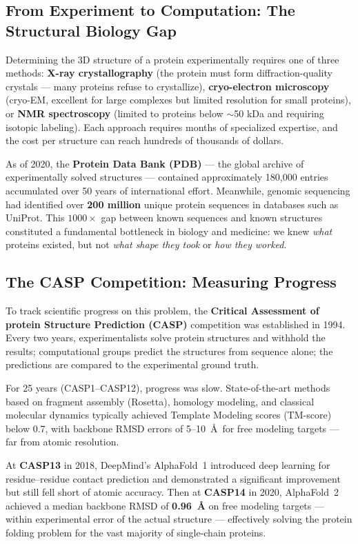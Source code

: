 ﻿\documentclass[12pt,a4paper]{article}
\begin{document}
\subsection{From Experiment to Computation: The Structural Biology Gap}

Determining the 3D structure of a protein experimentally requires one of three methods: \textbf{X-ray crystallography} (the protein must form diffraction-quality crystals --- many proteins refuse to crystallize), \textbf{cryo-electron microscopy} (cryo-EM, excellent for large complexes but limited resolution for small proteins), or \textbf{NMR spectroscopy} (limited to proteins below $\sim$50 kDa and requiring isotopic labeling). Each approach requires months of specialized expertise, and the cost per structure can reach hundreds of thousands of dollars.

As of 2020, the \textbf{Protein Data Bank (PDB)} --- the global archive of experimentally solved structures --- contained approximately 180,000 entries accumulated over 50 years of international effort. Meanwhile, genomic sequencing had identified over \textbf{200 million} unique protein sequences in databases such as UniProt. This $1000\times$ gap between known sequences and known structures constituted a fundamental bottleneck in biology and medicine: we knew \emph{what} proteins existed, but not \emph{what shape they took} or \emph{how they worked}.

\subsection{The CASP Competition: Measuring Progress}

To track scientific progress on this problem, the \textbf{Critical Assessment of protein Structure Prediction (CASP)} competition was established in 1994. Every two years, experimentalists solve protein structures and withhold the results; computational groups predict the structures from sequence alone; the predictions are compared to the experimental ground truth.

For 25 years (CASP1--CASP12), progress was slow. State-of-the-art methods based on fragment assembly (Rosetta), homology modeling, and classical molecular dynamics typically achieved Template Modeling scores (TM-score) below 0.7, with backbone RMSD errors of 5--10~\AA\ for free modeling targets --- far from atomic resolution.

At \textbf{CASP13} in 2018, DeepMind's AlphaFold~1 introduced deep learning for residue--residue contact prediction and demonstrated a significant improvement but still fell short of atomic accuracy. Then at \textbf{CASP14} in 2020, AlphaFold~2 achieved a median backbone RMSD of \textbf{0.96~\AA} on free modeling targets --- within experimental error of the actual structure --- effectively solving the protein folding problem for the vast majority of single-chain proteins.
\end{document}
